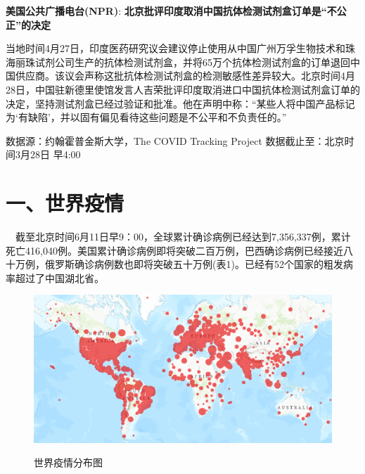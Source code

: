 \documentclass[
]{article}
\begin{document}
\textbf{\textcolor{glaucous}{美国公共广播电台(NPR)}}:
\textbf{北京批评印度取消中国抗体检测试剂盒订单是``不公正''的决定}

当地时间4月27日，印度医药研究议会建议停止使用从中国广州万孚生物技术和珠海丽珠试剂公司生产的抗体检测试剂盒，并将65万个抗体检测试剂盒的订单退回中国供应商。该议会声称这批抗体检测试剂盒的检测敏感性差异较大。北京时间4月28日，中国驻新德里使馆发言人吉荣批评印度取消进口中国抗体检测试剂盒订单的决定，坚持测试剂盒已经过验证和批准。他在声明中称：``某些人将中国产品标记为`有缺陷'，并以固有偏见看待这些问题是不公平和不负责任的。''

\vspace{5mm}
%
  \noindent{}%

\begin{small}
{数据源：约翰霍普金斯大学，The COVID Tracking Project \quad   数据截止至：北京时间3月28日 早4:00}
\end{small}

\vspace{-7mm}

\hypertarget{section-2}{%
\section{\texorpdfstring{\textcolor{glaucous}{一、世界疫情}}{}}\label{section-2}}

\vspace{-5mm}

\(\quad\)截至北京时间6月11日早9：00，全球累计确诊病例已经达到7,356,337例，累计死亡416,040例。美国累计确诊病例即将突破二百万例，巴西确诊病例已经接近八十万例，俄罗斯确诊病例数也即将突破五十万例(表1)。已经有52个国家的粗发病率超过了中国湖北省。

\begin{figure}[H]
\caption{世界疫情分布图} %
\centering
\includegraphics[]{./input/covid1.png} %
\label{} %
\end{figure}
\end{document}
